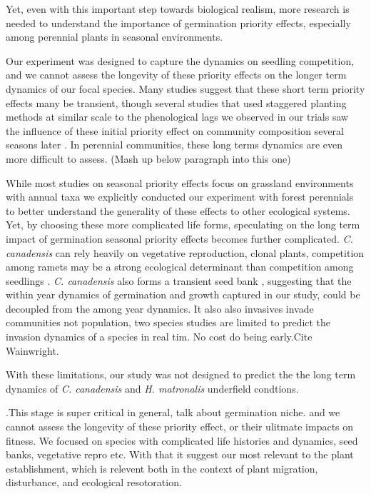\documentclass{article}\usepackage[]{graphicx}\usepackage[]{color}
\begin{document}
Yet, even with this important step towards biological realism, more research is needed to understand the importance of germination priority effects, especially among perennial plants in seasonal environments.


Our experiment was designed to capture the dynamics on seedling competition, and we cannot assess the longevity of these priority effects on the longer term dynamics of our focal species. Many studies suggest that these short term priority effects many be transient, though several studies that used staggered planting methods at similar scale to the phenological lags we observed in our trials saw the influence of these initial priority effect on community composition several seasons later \citep{}. In perennial communities, these long terms dynamics are even more difficult to assess. (Mash up below paragraph into this one)

While most studies on seasonal priority effects focus on grassland environments with annual taxa \citep{} we explicitly conducted our experiment with forest perennials to better understand the generality of these effects to other ecological systems. Yet, by choosing these more complicated life forms, speculating on the long term impact of germination seasonal priority effects becomes further complicated. \textit{C. canadensis} can rely heavily on vegetative reproduction, clonal plants, competition among ramets may be a strong ecological determinant than competition among seedlings \citep{}. \textit{C. canadensis} also forms a transient seed bank \citep{}, suggesting that the within year dynamics of germination and growth captured in our study, could be decoupled from the among year dynamics. It also also invasives invade communities not population, two species studies are limited to predict the invasion dynamics of a species in real tim. No cost do being early.Cite Wainwright.

With these limitations, our study was not designed to predict the the long term dynamics of \textit{C. canadensis} and \textit{H. matronalis} underfield condtions. 

.This stage is super critical in general, talk about germination niche.
and we cannot assess the longevity of these priority effect, or their ulitmate impacts on fitness. We focused on species with complicated life histories and dynamics, seed banks, vegetative repro etc. 
With that it suggest our most relevant to the plant establishment, which is relevent both in the context of plant migration, disturbance, and ecological resotoration.
\end{document}
